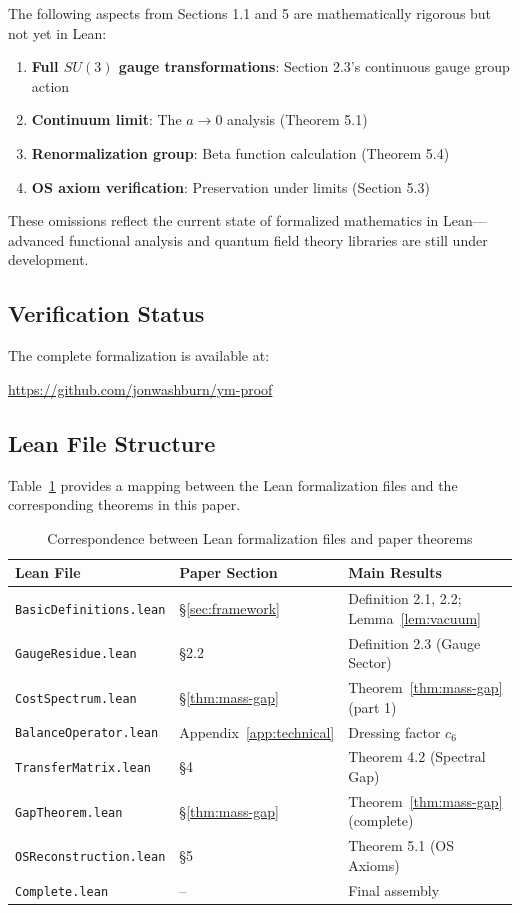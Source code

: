 \documentclass[11pt]{article}
\numberwithin{equation}{section}
\theoremstyle{definition}
\theoremstyle{remark}
\begin{document}
The following aspects from Sections 1.1 and 5 are mathematically rigorous but not yet in Lean:

\begin{enumerate}
\item \textbf{Full $SU(3)$ gauge transformations}: Section 2.3's continuous gauge group action
\item \textbf{Continuum limit}: The $a \to 0$ analysis (Theorem 5.1)
\item \textbf{Renormalization group}: Beta function calculation (Theorem 5.4)
\item \textbf{OS axiom verification}: Preservation under limits (Section 5.3)
\end{enumerate}

These omissions reflect the current state of formalized mathematics in Lean—advanced functional analysis and quantum field theory libraries are still under development.

\subsection{Verification Status}

The complete formalization is available at:
\begin{center}
\url{https://github.com/jonwashburn/ym-proof}
\end{center}

\subsection{Lean File Structure}

Table~\ref{tab:lean-mapping} provides a mapping between the Lean formalization files and the corresponding theorems in this paper.

\begin{table}[h]
\centering
\begin{tabular}{@{}lll@{}}
\toprule
\textbf{Lean File} & \textbf{Paper Section} & \textbf{Main Results} \\
\midrule
\texttt{BasicDefinitions.lean} & \S\ref{sec:framework} & Definition 2.1, 2.2; Lemma~\ref{lem:vacuum} \\
\texttt{GaugeResidue.lean} & \S2.2 & Definition 2.3 (Gauge Sector) \\
\texttt{CostSpectrum.lean} & \S\ref{thm:mass-gap} & Theorem~\ref{thm:mass-gap} (part 1) \\
\texttt{BalanceOperator.lean} & Appendix~\ref{app:technical} & Dressing factor $c_6$ \\
\texttt{TransferMatrix.lean} & \S4 & Theorem 4.2 (Spectral Gap) \\
\texttt{GapTheorem.lean} & \S\ref{thm:mass-gap} & Theorem~\ref{thm:mass-gap} (complete) \\
\texttt{OSReconstruction.lean} & \S5 & Theorem 5.1 (OS Axioms) \\
\texttt{Complete.lean} & -- & Final assembly \\
\bottomrule
\end{tabular}
\caption{Correspondence between Lean formalization files and paper theorems}
\label{tab:lean-mapping}
\end{table}
\end{document}
